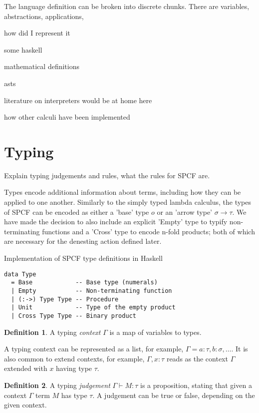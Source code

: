 \documentclass[12pt,a4paper]{report}
\theoremstyle{definition}
\newtheorem{definition}{Definition}[chapter]%
\theoremstyle{remark}
\begin{document}
The language definition can be broken into discrete chunks. There are variables, abstractions, applications, 

how did I represent it

some haskell

mathematical definitions

asts

literature on interpreters would be at home here

how other calculi have been implemented

\section{Typing}
Explain typing judgements and rules, what the rules for SPCF are.

Types encode additional information about terms, including how they can be applied to one another. Similarly to the simply typed lambda calculus, the types of SPCF can be encoded as either a 'base' type $o$ or an 'arrow type' $\sigma \rightarrow \tau$. We have made the decision to also include an explicit 'Empty' type to typify non-terminating functions and a 'Cross' type to encode n-fold products; both of which are necessary for the denesting action defined later.

\begin{listing}[!ht]
\caption{Implementation of SPCF type definitions in Haskell}
\begin{verbatim}
data Type
  = Base            -- Base type (numerals)
  | Empty           -- Non-terminating function
  | (:->) Type Type -- Procedure
  | Unit            -- Type of the empty product
  | Cross Type Type -- Binary product
\end{verbatim}
\label{listing:type-adt}
\end{listing}

\begin{definition}
    A typing \emph{context} $\Gamma$ is a map of variables to types.
\end{definition}

A typing context can be represented as a list, for example, $\Gamma = a:\tau, b:\sigma, \ldots$. It is also common to extend contexts, for example, $\Gamma, x:\tau$ reads as the context $\Gamma$ extended with $x$ having type $\tau$. 

\begin{definition}
    A typing \emph{judgement} $\Gamma \vdash M:\tau$ is a proposition, stating that given a context $\Gamma$ term $M$ has type $\tau$. A judgement can be true or false, depending on the given context.
\end{definition}
\end{document}
